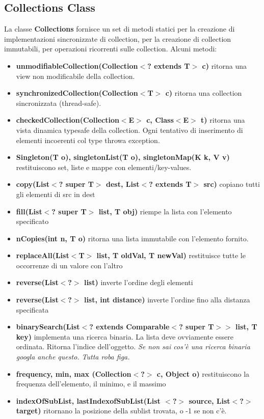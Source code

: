 \documentclass[11pt]{article}
\begin{document}
\subsection{Collections Class}
La classe \textbf{Collections} fornisce un set di metodi statici per la creazione di implementazioni sincronizzate di collection, per la creazione di collection immutabili, per operazioni ricorrenti sulle collection.
Alcuni metodi:
\begin{itemize}
    \item \textbf{unmodifiableCollection(Collection$<$? extends T$>$ c)} ritorna una view non modificabile della collection. 
    \item \textbf{synchronizedCollection(Collection$<$T$>$ c)} ritorna una collection sincronizzata (thread-safe).
    \item \textbf{checkedCollection(Collection$<$E$>$ c, Class$<$E$>$ t)} ritorna una vista dinamica typesafe della collection. Ogni tentativo di inserimento di elementi incoerenti col type throwa exception.
    \item \textbf{Singleton(T o), singletonList(T o), singletonMap(K k, V v)} restituiscono set, liste e mappe con elementi/key-values.
    \item \textbf{copy(List$<$? super T$>$ dest, List$<$? extends T$>$ src)} copiano tutti gli elementi di src in dest 
    \item \textbf{fill(List$<$? super T$>$ list, T obj)} riempe la lista con l'elemento specificato 
    \item \textbf{nCopies(int n, T o)} ritorna una lista immutabile con l'elemento fornito.
    \item \textbf{replaceAll(List$<$T$>$ list, T oldVal, T newVal)} restituisce tutte le occorrenze di un valore con l'altro 
    \item \textbf{reverse(List$<$?$>$ list)} inverte l'ordine degli elementi
    \item \textbf{reverse(List$<$?$>$ list, int distance)} inverte l'ordine fino alla distanza specificata
    \item \textbf{binarySearch(List$<$? extends Comparable$<$? super T$>$$>$ list, T key)} implementa una ricerca binaria. La lista deve ovviamente essere ordinata. Ritorna l'indice dell'oggetto. \textit{Se non sai cos'è una ricerca binaria googla anche questo. Tutta roba figa.}
    \item \textbf{frequency, min, max (Collection$<$?$>$ c, Object o)} restituiscono la frequenza dell'elemento, il minimo, e il massimo
    \item \textbf{indexOfSubList, lastIndexofSubList(List $<$?$>$ source, List$<$?$>$ target)} ritornano la posizione della sublist trovata, o -1 se non c'è. 
\end{itemize}
\end{document}
